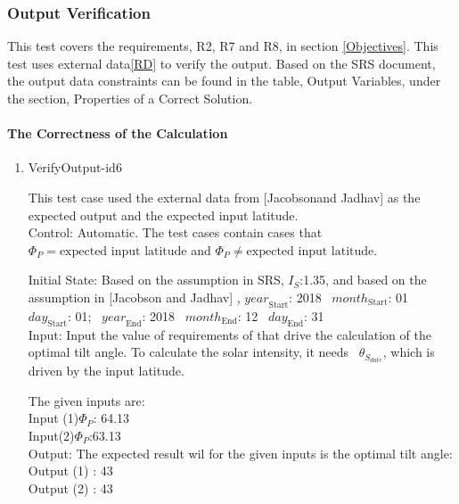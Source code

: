 \documentclass[12pt, titlepage]{article}
\begin{document}
\subsubsection{Output Verification}\label{STD_VO} 

This test covers the requirements, R2, R7 and R8, in section \ref{Objectives}. This
test
uses external data\ref{RD} to verify the output. Based on the SRS 
document\cite{YS2019}, the output data constraints can be found in the
table, Output Variables, under the section, Properties of a Correct Solution. 

\paragraph{The Correctness of the Calculation}
\begin{enumerate}




\item{VerifyOutput-id6\\} 

This test case used the external data from [Jacobsonand
Jadhav] \cite{JacobsonandJadhav} as the expected output and the expected
input latitude.\\ 

Control: Automatic. The test cases contain cases that $\Phi_P
= \text{expected input latitude}$ and $\Phi_P \ne \text{expected input
latitude}$. 

Initial State: Based on the assumption in SRS\cite{YS2019}, $I_{S}$:1.35, and
based on the assumption in [Jacobson and Jadhav] \cite{JacobsonandJadhav},
$\mathit{year}_\text{Start}$: 2018
~$\mathit{month}_\text{Start}$: 01 
~$\mathit{day}_\text{Start}$: 01;
~$\mathit{year}_\text{End}$: 2018 
~$\mathit{month}_\text{End}$: 12
~$\mathit{day}_\text{End}$: 31\\ 

Input: Input the value of requirements of
\progname that drive the calculation of the optimal tilt angle. To calculate
the solar intensity, it needs ~$\theta_{S_{date}}$, which is driven by the input latitude.

The given inputs are:\\
Input (1)$\Phi_P$: 64.13 \\ 
Input(2)$\Phi_P$:63.13\\

Output: The expected result wil for the given inputs is the optimal tilt
angle:\\ Output (1) : 43\\ Output (2) : 43\\


\end{enumerate}
\end{document}
